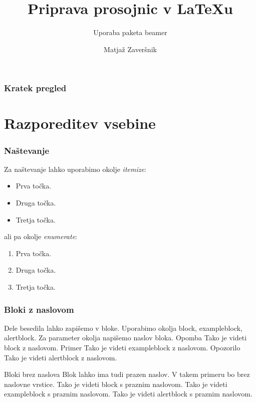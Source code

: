 \documentclass{beamer}
\title{Priprava prosojnic v {\LaTeX}u}
\subtitle{Uporaba paketa beamer}
\author{Matjaž Zaveršnik}
\institute{FMF Fakulteta za matematiko in fiziko}
\begin{document}
\frame{\titlepage}




\begin{frame}
   \frametitle{Kratek pregled}
      \tableofcontents%
       \section {Razporeditev vsebine}   
\end{frame}
\begin{frame}
   \frametitle{Naštevanje}
   Za naštevanje lahko uporabimo okolje \emph{itemize}:
      \begin{itemize}
         \item Prva točka.
         \item Druga točka.
         \item Tretja točka.
      \end{itemize}
   ali pa okolje \emph{enumerate}:
   \begin{enumerate}
      \item Prva točka.
      \item Druga točka.
      \item Tretja točka.
   \end{enumerate}
\end{frame}
\begin{frame}
   \frametitle{Bloki z naslovom}
   Dele besedila lahko zapišemo v bloke.
   Uporabimo okolja block, exampleblock, alertblock.
   Za parameter okolja napišemo naslov bloka.
   Opomba
      Tako je videti block z naslovom.
   Primer
      Tako je videti exampleblock z naslovom.
   Opozorilo
      Tako je videti alertblock z naslovom.
\end{frame}

   Bloki brez naslova
   Blok lahko ima tudi prazen naslov.
   V takem primeru bo brez naslovne vrstice.
      Tako je videti block s praznim naslovom.
      Tako je videti exampleblock s praznim naslovom.
      Tako je videti alertblock s praznim naslovom.

\end{document}
